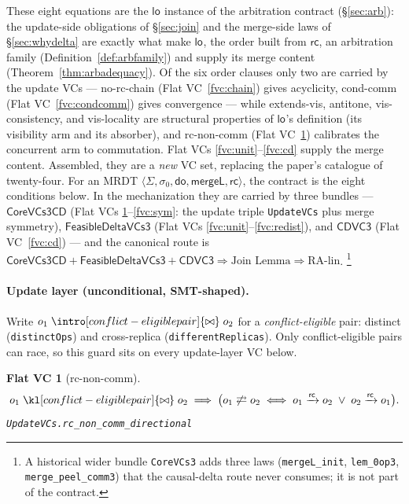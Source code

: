 \documentclass[11pt]{article}
\newtheorem{fvc}{Flat VC}
\newcommand{\rc}{\xrightarrow{\mathsf{rc}}}      %
\newcommand{\rcrel}{\mathsf{rc}}                 %
\newcommand{\ncomm}{\not\rightleftarrows}
\newcommand{\mergeL}{\mathsf{mergeL}}
\newcommand{\Sinit}{\sigma_0}
\newcommand{\loE}[1]{\mathsf{lo}^{#1}}
\newcommand{\co}{\mathsf{CoreVCs3CD}}
\newcommand{\fd}{\mathsf{FeasibleDeltaVCs3}}
\newcommand{\cd}{\mathsf{CDVC3}}
\newcommand{\lean}[1]{\texttt{#1}}
\begin{document}
These eight equations are the $\loE{}$ instance of the arbitration
contract (\S\ref{sec:arb}): the update-side obligations of
\S\ref{sec:join} and the merge-side laws of \S\ref{sec:whydelta} are
exactly what make $\loE{}$, the order built from $\rcrel$, an arbitration
family (Definition~\ref{def:arbfamily}) and supply its merge content
(Theorem~\ref{thm:arbadequacy}). Of the six order clauses only two are
carried by the update VCs --- no-rc-chain (Flat VC~\ref{fvc:chain}) gives
acyclicity, cond-comm (Flat VC~\ref{fvc:condcomm}) gives convergence ---
while extends-vis, antitone, vis-consistency, and vis-locality are
structural properties of $\loE{}$'s definition (its visibility arm and its
absorber), and rc-non-comm (Flat VC~\ref{fvc:rcnc}) calibrates the
concurrent arm to commutation. Flat VCs \ref{fvc:unit}--\ref{fvc:cd} supply
the merge content. Assembled, they are a \emph{new} VC set, replacing the
paper's catalogue of twenty-four. For an MRDT
$\langle \Sigma, \Sinit, \mathsf{do}, \mergeL, \rcrel\rangle$, the
contract is the eight conditions below. In the
mechanization they are carried by three bundles ---
$\co$ (Flat VCs \ref{fvc:rcnc}--\ref{fvc:sym}: the update triple
\lean{UpdateVCs} plus merge symmetry), $\fd$ (Flat VCs
\ref{fvc:unit}--\ref{fvc:redist}), and $\cd$ (Flat
VC~\ref{fvc:cd}) --- and the canonical route is
$\co + \fd + \cd \Rightarrow \text{Join Lemma} \Rightarrow
\text{RA-lin}$.%
\footnote{A historical wider bundle \lean{CoreVCs3} adds three laws
(\lean{mergeL\_init}, \lean{lem\_0op3}, \lean{merge\_peel\_comm3}) that
the causal-delta route never consumes; it is not part of the contract.}

\paragraph{Update layer (unconditional, SMT-shaped).} Write $o_1
\mathrel{\intro[conflict-eligible pair]{\bowtie}} o_2$ for a
\emph{conflict-eligible} pair: distinct
(\lean{distinctOps}) and cross-replica (\lean{differentReplicas}). Only
conflict-eligible pairs can race, so this guard sits on every
update-layer VC below.

\begin{fvc}[rc-non-comm]
\label{fvc:rcnc}
\[
  o_1 \mathrel{\kl[conflict-eligible pair]{\bowtie}} o_2
  \;\Longrightarrow\;
  \bigl(o_1 \ncomm o_2
    \;\Longleftrightarrow\;
    o_1 \rc o_2 \;\vee\; o_2 \rc o_1\bigr).
\]
\hfill\lean{UpdateVCs.rc\_non\_comm\_directional}
\end{fvc}
\end{document}
